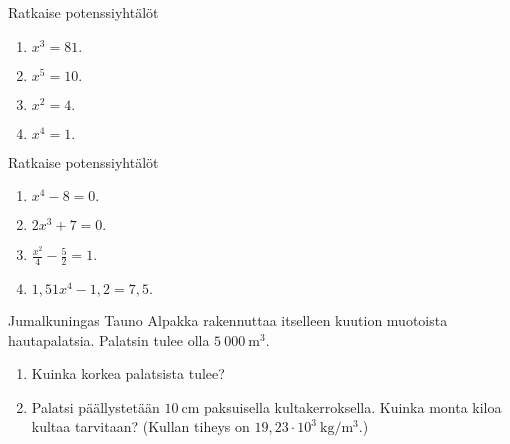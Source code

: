 
\begin{tehtava}
Ratkaise potenssiyhtälöt
\begin{enumerate}
\item $x^3 = 81.$
\item $x^5 = 10.$
\item $x^2 = 4.$
\item $x^4 = 1.$
\end{enumerate}
\end{tehtava}

\begin{tehtava}
Ratkaise potenssiyhtälöt
\begin{enumerate}
\item $x^4 - 8 = 0.$
\item $2x^3 + 7 = 0.$
\item $\frac{x^2}{4} - \frac{5}{2} = 1.$
\item $1{,}51 x^4 - 1{,}2 = 7{,}5.$
\end{enumerate}
\end{tehtava}

\begin{tehtava}
Jumalkuningas Tauno Alpakka rakennuttaa itselleen kuution muotoista hautapalatsia.  Palatsin tulee olla $5\ 000\ \mathrm{m}^3$. 
\begin{enumerate}
\item Kuinka korkea palatsista tulee?
\item Palatsi päällystetään $10\ \mathrm{cm}$ paksuisella kultakerroksella.  Kuinka monta kiloa kultaa tarvitaan? (Kullan tiheys on $19{,}23\cdot 10^3\ \mathrm{ kg}/\mathrm{m}^3$.)
\end{enumerate}
\end{tehtava}

